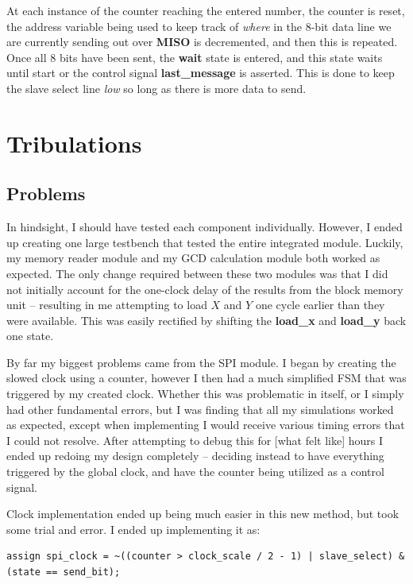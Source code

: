 \documentclass[a4paper, 12pt]{article}
\begin{document}
At each instance of the counter reaching the entered number, the counter is reset, the address variable being used to keep track of \textit{where} in the 8-bit data line we are currently sending out over \textbf{MISO} is decremented, and then this is repeated. Once all 8 bits have been sent, the \textbf{wait} state is entered, and this state waits until start or the control signal \textbf{last\_message} is asserted. This is done to keep the slave select line \textit{low} so long as there is more data to send.

\section{Tribulations}
\label{sec:tribulations}
\subsection{Problems}
In hindsight, I should have tested each component individually. However, I ended up creating one large testbench that tested the entire integrated module. Luckily, my memory reader module and my GCD calculation module both worked as expected. The only change required between these two modules was that I did not initially account for the one-clock delay of the results from the block memory unit -- resulting in me attempting to load $X$ and $Y$ one cycle earlier than they were available. This was easily rectified by shifting the \textbf{load\_x} and \textbf{load\_y} back one state.

By far my biggest problems came from the SPI module. I began by creating the slowed clock using a counter, however I then had a much simplified FSM that was triggered by my created clock. Whether this was problematic in itself, or I simply had other fundamental errors, but I was finding that all my simulations worked as expected, except when implementing I would receive various timing errors that I could not resolve. After attempting to debug this for [what felt like] hours I ended up redoing my design completely -- deciding instead to have everything triggered by the global clock, and have the counter being utilized as a control signal.

Clock implementation ended up being much easier in this new method, but took some trial and error. I ended up implementing it as:

\begin{mdframed}[backgroundcolor=code-gray, roundcorner=10pt, innerleftmargin=25, innertopmargin=5, innerbottommargin=5]	
\begin{lstlisting}[nolol=True, caption=SPI Clock Generation, label={lst:memory-reader}]
	assign spi_clock = ~((counter > clock_scale / 2 - 1) | slave_select) & (state == send_bit); 
\end{lstlisting}
\end{mdframed}
\end{document}
